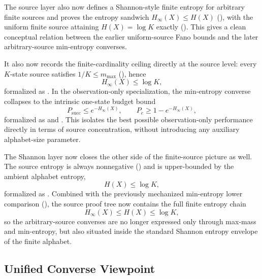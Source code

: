 The source layer also now defines a Shannon-style finite entropy for arbitrary finite sources and proves the entropy sandwich $H_{\infty}(X)\le H(X)$ (), with the uniform finite source attaining $H(X)=\log K$ exactly (). This gives a clean conceptual relation between the earlier uniform-source Fano bounds and the later arbitrary-source min-entropy converses.

It also now records the finite-cardinality ceiling directly at the source level: every $K$-state source satisfies $1/K\le m_{\max}$ (), hence
\[
H_{\infty}(X) \le \log K,
\]
formalized as . In the observation-only specialization, the min-entropy converse collapses to the intrinsic one-state budget bound
\[
P_{\mathrm{succ}} \le e^{-H_{\infty}(X)},
\qquad
P_e \ge 1-e^{-H_{\infty}(X)},
\]
formalized as  and . This isolates the best possible observation-only performance directly in terms of source concentration, without introducing any auxiliary alphabet-size parameter.

The Shannon layer now closes the other side of the finite-source picture as well. The source entropy is always nonnegative () and is upper-bounded by the ambient alphabet entropy,
\[
H(X) \le \log K,
\]
formalized as . Combined with the previously mechanized min-entropy lower comparison (), the source proof tree now contains the full finite entropy chain
\[
H_{\infty}(X) \le H(X) \le \log K,
\]
so the arbitrary-source converses are no longer expressed only through max-mass and min-entropy, but also situated inside the standard Shannon entropy envelope of the finite alphabet.

\subsection{Unified Converse Viewpoint}\label{sec:unified-converse}

